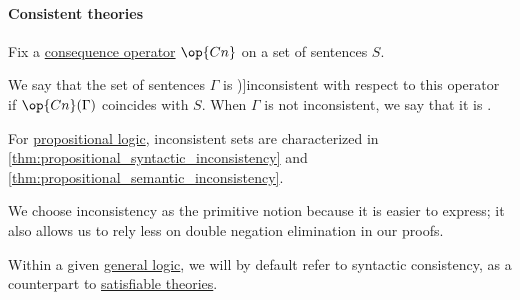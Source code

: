 \paragraph{Consistent theories}

\begin{definition}\label{def:consistent_set_of_sentences}
  Fix a \hyperref[def:consequence_operator]{consequence operator} \( \op{Cn} \) on a set of sentences \( S \).

  We say that the set of sentences \( \Gamma \) is \term[ru=противоречивое (множество формул) (\cite[def. 1.3.15]{Герасимов2014Вычислимость})]{inconsistent} with respect to this operator if \( \op{Cn}(\Gamma) \) coincides with \( S \). When \( \Gamma \) is not inconsistent, we say that it is .
\end{definition}
\begin{comments}
  \item For \hyperref[def:propositional_logic]{propositional logic}, inconsistent sets are characterized in \cref{thm:propositional_syntactic_inconsistency} and \cref{thm:propositional_semantic_inconsistency}.

  \item We choose inconsistency as the primitive notion because it is easier to express; it also allows us to rely less on double negation elimination in our proofs.

  \item Within a given \hyperref[def:general_logic]{general logic}, we will by default refer to syntactic consistency, as a counterpart to \hyperref[def:propositional_semantics/satisfaction]{satisfiable theories}.
\end{comments}

